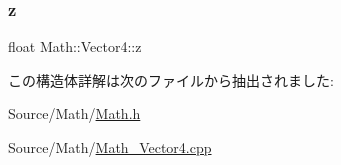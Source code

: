 \subsubsection{\texorpdfstring{z}{z}}
{\footnotesize\ttfamily float Math\+::\+Vector4\+::z}



この構造体詳解は次のファイルから抽出されました\+:\begin{DoxyCompactItemize}
\item 
Source/\+Math/\mbox{\hyperlink{_math_8h}{Math.\+h}}\item 
Source/\+Math/\mbox{\hyperlink{_math___vector4_8cpp}{Math\+\_\+\+Vector4.\+cpp}}\end{DoxyCompactItemize}
